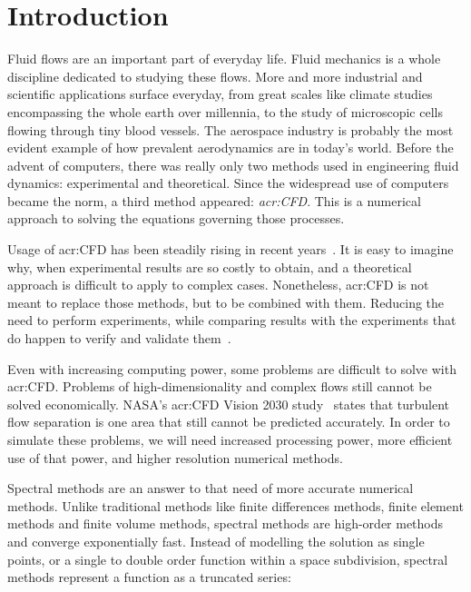 \chapter{Introduction}

Fluid flows are an important part of everyday life. Fluid mechanics is a whole discipline dedicated
to studying these flows. More and more industrial and scientific applications surface everyday, from
great scales like climate studies encompassing the whole earth over millennia, to the study of
microscopic cells flowing through tiny blood vessels. The aerospace industry is probably the most
evident example of how prevalent aerodynamics are in today's world. Before the advent of computers,
there was really only two methods used in engineering fluid dynamics: experimental and theoretical.
Since the widespread use of computers became the norm, a third method appeared:
\textit{\acrfull{acr:CFD}}. This is a numerical approach to solving the equations governing those
processes.

Usage of \acrshort{acr:CFD} has been steadily rising in recent years~\cite{Slotnick2014}. It is easy
to imagine why, when experimental results are so costly to obtain, and a theoretical approach is
difficult to apply to complex cases. Nonetheless, \acrshort{acr:CFD} is not meant to replace those
methods, but to be combined with them. Reducing the need to perform experiments, while comparing
results with the experiments that do happen to verify and validate them~\cite{Stern2001}.

Even with increasing computing power, some problems are difficult to solve with \acrshort{acr:CFD}.
Problems of high-dimensionality and complex flows still cannot be solved economically. NASA's
\acrshort{acr:CFD} Vision 2030 study~\cite{Slotnick2014} states that turbulent flow separation is
one area that still cannot be predicted accurately. In order to simulate these problems, we will
need increased processing power, more efficient use of that power, and higher resolution numerical
methods.

Spectral methods are an answer to that need of more accurate numerical methods. Unlike traditional
methods like finite differences methods, finite element methods and finite volume methods, spectral
methods are high-order methods and converge exponentially fast. Instead of modelling the solution as
single points, or a single to double order function within a space subdivision, spectral methods
represent a function as a truncated series:

